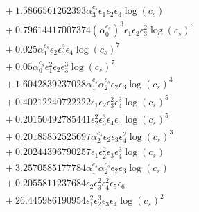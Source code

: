 \documentclass[10pt]{article}
\begin{document}
\begin{align*}
&{}  + 1.5866561262393 \alpha_{3}^{c_s} \epsilon_{1} \epsilon_{2} \epsilon_{3} \log{\left(c_{s} \right)} \\
&{}  + 0.79614417007374 \left(\alpha_{0}^{c_s}\right)^{3} \epsilon_{1} \epsilon_{2} \epsilon_{3}^{2} \log{\left(c_{s} \right)}^{6} \\
&{}  + 0.025 \alpha_{1}^{c_s} \epsilon_{2} \epsilon_{3}^{3} \epsilon_{4} \log{\left(c_{s} \right)}^{7} \\
&{}  + 0.05 \alpha_{0}^{c_s} \epsilon_{1}^{2} \epsilon_{2} \epsilon_{3}^{3} \log{\left(c_{s} \right)}^{7} \\
&{}  + 1.6042839237028 \alpha_{1}^{c_s} \alpha_{2}^{c_s} \epsilon_{2} \epsilon_{3} \log{\left(c_{s} \right)}^{3} \\
&{}  + 0.40212240722222 \epsilon_{1} \epsilon_{2} \epsilon_{3}^{2} \epsilon_{4}^{3} \log{\left(c_{s} \right)}^{5} \\
&{}  + 0.20150492785441 \epsilon_{2}^{2} \epsilon_{3}^{3} \epsilon_{4} \epsilon_{5} \log{\left(c_{s} \right)}^{5} \\
&{}  + 0.20185852525697 \alpha_{2}^{c_s} \epsilon_{2} \epsilon_{3} \epsilon_{4}^{2} \log{\left(c_{s} \right)}^{3} \\
&{}  + 0.20244396790257 \epsilon_{1} \epsilon_{2}^{2} \epsilon_{3} \epsilon_{4}^{3} \log{\left(c_{s} \right)} \\
&{}  + 3.2570585177784 \alpha_{1}^{c_s} \alpha_{2}^{c_s} \epsilon_{2} \epsilon_{3} \log{\left(c_{s} \right)} \\
&{}  + 0.2055811237684 \epsilon_{2} \epsilon_{3}^{2} \epsilon_{4}^{2} \epsilon_{5} \epsilon_{6} \\
&{}  + 26.445986190954 \epsilon_{1}^{2} \epsilon_{2}^{3} \epsilon_{3} \epsilon_{4} \log{\left(c_{s} \right)}^{2}
\end{align*}
\end{document}
